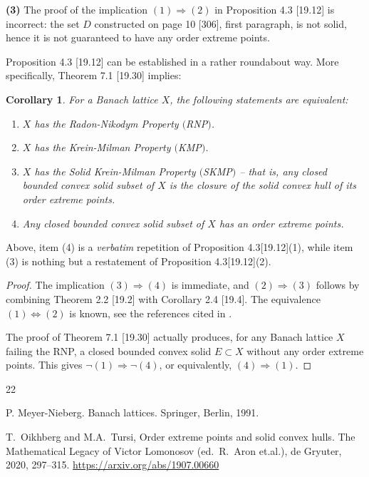 \documentclass[11pt]{amsart}
\newtheorem*{corollary*}{Corollary}
\theoremstyle{definition}
\begin{document}
{\bf (3)} The proof of the implication $(1) \Rightarrow (2)$ in Proposition 4.3 [19.12] is incorrect: the set $D$ constructed on page 10 [306], first paragraph, is not solid, hence it is not guaranteed to have any order extreme points.

Proposition 4.3 [19.12] can be established in a rather roundabout way. More specifically, Theorem 7.1 [19.30] implies:

\begin{corollary*}
For a Banach lattice $X$, the following statements are equivalent:
\begin{enumerate}
	\item $X$ has the Radon-Nikodym Property $($RNP$)$.
	\item $X$ has the Krein-Milman Property $($KMP$)$.
	\item $X$ has the Solid Krein-Milman Property $($SKMP$)$ -- that is, any closed bounded convex solid subset of $X$ is the closure of the solid convex hull of its order extreme points.
	\item Any closed bounded convex solid subset of $X$ has an order extreme points.
\end{enumerate}
\end{corollary*}

Above, item (4) is a \emph{verbatim} repetition of Proposition 4.3[19.12](1), while item (3) is nothing but a restatement of Proposition 4.3[19.12](2).

\begin{proof}
The implication $(3) \Rightarrow (4)$ is immediate, and $(2) \Rightarrow (3)$ follows by combining Theorem 2.2 [19.2] with Corollary 2.4 [19.4]. The equivalence $(1) \Leftrightarrow (2)$ is known, see the references cited in \cite{OiTu}.

The proof of  Theorem 7.1 [19.30] actually produces, for any Banach lattice $X$ failing the RNP, a closed bounded convex solid $E \subset X$ without any order extreme points. This gives $\lnot (1) \Rightarrow \lnot (4)$, or equivalently, $(4) \Rightarrow (1)$.
\end{proof}


\begin{thebibliography}{22}

 P. Meyer-Nieberg.
Banach lattices. Springer, Berlin, 1991.

 T.~Oikhberg and M.A.~Tursi,
Order extreme points and solid convex hulls.
The Mathematical Legacy of Victor Lomonosov (ed.~R.~Aron et.al.), de Gryuter, 2020, 297--315.
\url{https://arxiv.org/abs/1907.00660}


\end{thebibliography}
\end{document}

